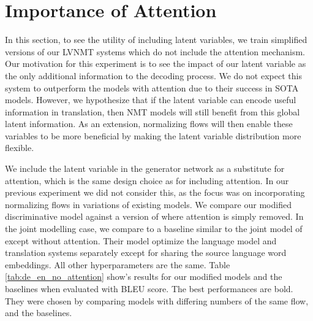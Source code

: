 




\section{Importance of Attention}

In this section, to see the utility of including latent variables, we train simplified versions of our \ac{LVNMT} systems which do not include the attention mechanism. Our motivation for this experiment is to see the impact of our latent variable as the only additional information to the decoding process. We do not expect this system to outperform the models with attention due to their success in \ac{SOTA} models\cite{bahdanau2014NMTBYJoint, vaswani2017attentionTransformer}. However, we hypothesize that if the latent variable can encode useful information in translation, then \ac{NMT} models will still benefit from this global latent information. As an extension, normalizing flows will then enable these variables to be more beneficial by making the latent variable distribution more flexible.

We include the latent variable in the generator network as a substitute for attention, which is the same design choice as \citet{bahdanau2014NMTBYJoint} for including attention. In our previous experiment we did not consider this, as the focus was on incorporating normalizing flows in variations of existing models. We compare our modified discriminative model against a version of \citet{bahdanau2014NMTBYJoint} where attention is simply removed. In the joint modelling case, we compare to a baseline similar to the joint model of \citet{eikema2018AEVNMT} except without attention. Their model optimize the language model and translation systems separately except for sharing the source language word embeddings. All other hyperparameters are the same. Table \ref{tab:de_en_no_attention} show's results for our modified models and the baselines when evaluated with BLEU score. The best performances are bold. They were chosen by comparing models with differing numbers of the same flow, and the baselines.

